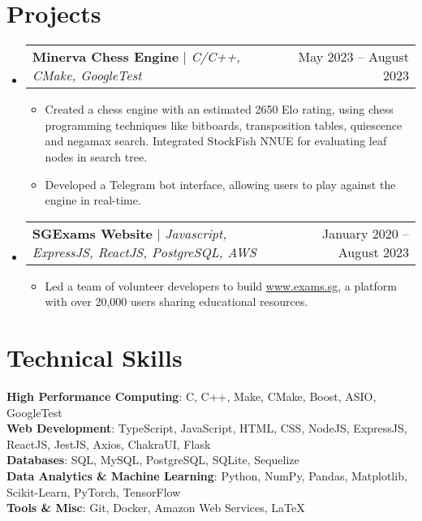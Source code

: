 \documentclass[letterpaper,11pt]{article}
\makeatletter
\newcommand{\resumeItem}[1]{
  \item\footnotesize{
    {#1 \vspace{-2pt}}
  }
}
\newcommand{\resumeProjectHeading}[2]{
    \item
    \begin{tabular*}{0.97\textwidth}{l@{\extracolsep{\fill}}r}
      \small#1 & #2 \\
    \end{tabular*}\vspace{-6pt}
}
\newcommand{\resumeSubHeadingListStart}{\begin{itemize}[leftmargin=0.15in, label={}]}
\newcommand{\resumeSubHeadingListEnd}{\end{itemize}}
\newcommand{\resumeItemListStart}{\begin{itemize}}
\newcommand{\resumeItemListEnd}{\end{itemize}\vspace{-7pt}}
\makeatother
\begin{document}
\section{Projects}
    \resumeSubHeadingListStart
      \resumeProjectHeading
          {\textbf{Minerva Chess Engine} $|$ \emph{C/C++, CMake, GoogleTest}}{May 2023 -- August 2023}
          \resumeItemListStart
            \resumeItem{Created a chess engine with an estimated 2650 Elo rating, using chess programming techniques like bitboards, transposition tables, quiescence and negamax search. Integrated StockFish NNUE for evaluating leaf nodes in search tree.}
            \resumeItem{Developed a Telegram bot interface, allowing users to play against the engine in real-time.}
          \resumeItemListEnd
      \resumeProjectHeading
          {\textbf{SGExams Website} $|$ \emph{Javascript, ExpressJS, ReactJS, PostgreSQL, AWS}}{January 2020 -- August 2023}
          \resumeItemListStart
            \resumeItem{Led a team of volunteer developers to build \href{https://www.exams.sg}{www.exams.sg}, a platform with over 20,000 users sharing educational resources.}
          \resumeItemListEnd
    \resumeSubHeadingListEnd

\section{Technical Skills}
 \begin{itemize}[leftmargin=0.15in, label={}]
    \footnotesize{\item{
     \textbf{High Performance Computing}{: C, C++, Make, CMake, Boost, ASIO, GoogleTest} \\
     \textbf{Web Development}{: TypeScript, JavaScript, HTML, CSS, NodeJS, ExpressJS, ReactJS, JestJS, Axios, ChakraUI, Flask} \\
     \textbf{Databases}{: SQL, MySQL, PostgreSQL, SQLite, Sequelize} \\
     \textbf{Data Analytics \& Machine Learning}{: Python, NumPy, Pandas, Matplotlib, Scikit-Learn, PyTorch, TensorFlow} \\
     \textbf{Tools \& Misc}{: Git, Docker, Amazon Web Services, \LaTeX} \\
    }}
 \end{itemize}

\end{document}

